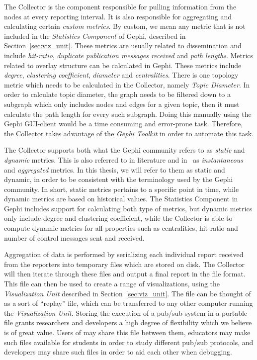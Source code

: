 The Collector is the component responsible for pulling information from
the nodes at every reporting interval. It is also responsible for
aggregating and calculating certain \emph{custom metrics}. By custom, we
mean any metric that is not included in the \emph{Statistics Component}
of Gephi, described in Section~\ref{sec:viz_unit}. These metrics are
usually related to dissemination and include \emph{hit-ratio},
\emph{duplicate publication messages received} and \emph{path lengths}.
Metrics related to overlay structure can be calculated in Gephi. These
metrics include \emph{degree}, \emph{clustering coefficient},
\emph{diameter} and \emph{centralities}. There is one topology metric
which needs to be calculated in the Collector, namely \emph{Topic
    Diameter}. In order to calculate topic diameter, the graph needs to
be filtered down to a subgraph which only includes nodes and edges for a
given topic, then it must calculate the path length for every such
subgraph. Doing this manually using the Gephi GUI-client would be a time
consuming and error-prone task.  Therefore, the Collector takes
advantage of the \emph{Gephi Toolkit} in order to automate this task.

The Collector supports both what the Gephi community
refers to as \emph{static} and \emph{dynamic} metrics. This is also
referred to in literature and in~\cite{korsveien2014vizpub} as
\emph{instantaneous} and \emph{aggregated} metrics. In this thesis, we
will refer to them as static and dynamic, in order to be consistent
with the terminology used by the Gephi community. In short, static
metrics pertains to a specific point in time, while dynamic metrics are
based on historical values. The Statistics Component in Gephi includes
support for calculating both type of metrics, but dynamic metrics only include degree and
clustering coefficient, while the Collector is able to compute dynamic
metrics for all properties such as centralities, hit-ratio and number of
control messages sent and received.

Aggregation of data is performed by serializing each individual report
received from the reporters into temporary files which are stored on
disk. The Collector will then iterate through these files and output a
final report in the \gexf{} file format. This file can then be used to
create a range of visualizations, using the \emph{Visualization Unit}
described in Section~\ref{sec:viz_unit}. The \gexf{} file can be thought
of as a sort of ``replay'' file, which can be transferred to any other
computer running the \emph{Visualization Unit}. Storing the execution
of a pub/sub-system in a portable file grants researchers and developers
a high degree of flexibility which we believe is of great value. Users
of \demo{} may share this file between them, educators may make such
files available for students in order to study different pub/sub
protocols, and developers may share such files in order to aid each
other when debugging.


